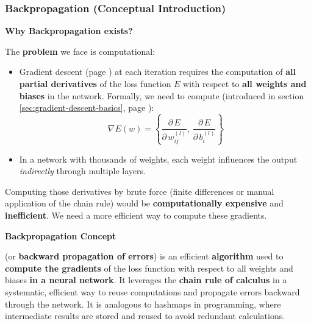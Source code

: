 \subsubsection{Backpropagation (Conceptual Introduction)}

\begin{flushleft}
    \textcolor{Green3}{ \textbf{Why Backpropagation exists?}}
\end{flushleft}
The \textbf{problem} we face is computational:
\begin{itemize}
    \item Gradient descent (page \pageref{sec:gradient-descent-basics}) at each iteration requires the computation of \textbf{all partial derivatives} of the loss function $E$ with respect to \textbf{all weights and biases} in the network. Formally, we need to compute (introduced in section \ref{sec:gradient-descent-basics}, page \pageref{eq:gradient-neural-network}):
    \begin{equation*}
        \nabla E(w) = \left\{
            \dfrac{\partial \, E}{\partial \, w_{ij}^{(l)}} , \,
            \dfrac{\partial \, E}{\partial \, b_{i}^{(l)}}
        \right\}
    \end{equation*}
    \item In a network with thousands of weights, each weight influences the output \emph{indirectly} through multiple layers.
\end{itemize}
Computing those derivatives by brute force (finite differences or manual application of the chain rule) would be \textbf{computationally expensive} and \textbf{inefficient}. We need a more efficient way to compute these gradients.

\highspace
\begin{flushleft}
    \textcolor{Green3}{ \textbf{Backpropagation Concept}}
\end{flushleft}
 (or \textbf{backward propagation of errors}) is an efficient \textbf{algorithm} used to \textbf{compute the gradients} of the loss function with respect to all weights and biases \textbf{in a neural network}. It leverages the \textbf{chain rule of calculus} in a systematic, efficient way to reuse computations and propagate errors backward through the network. It is analogous to hashmaps in programming, where intermediate results are stored and reused to avoid redundant calculations.


